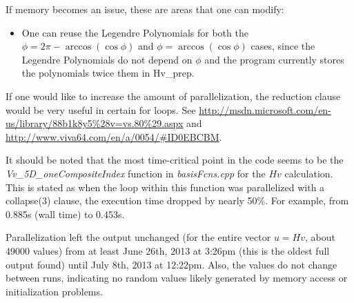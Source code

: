 \documentclass{revtex4-1}
\begin{document}
If memory becomes an issue, these are areas that one can modify:
\begin{itemize}
\item One can reuse the Legendre Polynomials for both the $\phi = 2\pi - \arccos(\cos \phi)$ and $\phi = \arccos(\cos \phi)$ cases, since the Legendre Polynomials do not depend on $\phi$ and the program currently stores the polynomials twice them in Hv\_prep.
\end{itemize}

If one would like to increase the amount of parallelization, the reduction clause would be very useful in certain for loops. See \url{http://msdn.microsoft.com/en-us/library/88b1k8y5%28v=vs.80%29.aspx} and \url{http://www.viva64.com/en/a/0054/#ID0EBCBM}. 

It should be noted that the most time-critical point in the code seems to be the \emph{Vv\_5D\_oneCompositeIndex} function in \emph{basisFcns.cpp} for the $Hv$ calculation. This is stated as when the loop within this function was parallelized with a collapse(3) clause, the execution time dropped by nearly 50\%. For example, from 0.885s (wall time) to 0.453s.

Parallelization left the output unchanged (for the entire vector $u = Hv$, about 49000 values) from at least June 26th, 2013 at 3:26pm (this is the oldest full output found) until July 8th, 2013 at 12:22pm. Also, the values do not change between runs, indicating no random values likely generated by memory access or initialization problems.
\end{document}
